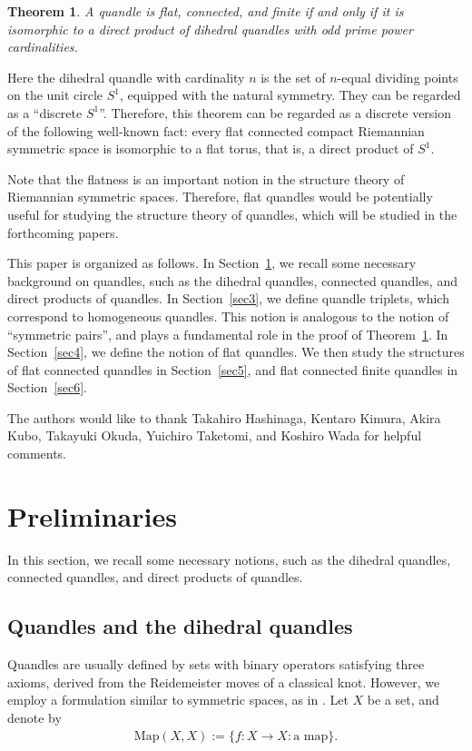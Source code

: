 \documentclass[12pt]{amsart}
\newtheorem{Thm}[Prop]{Theorem}
\theoremstyle{definition}
\begin{document}
\begin{Thm}\label{Thm1.1}
A quandle is flat, connected, and finite if and only if it is isomorphic to a direct product of dihedral quandles with odd prime power cardinalities.
\end{Thm}

Here the dihedral quandle with cardinality $ n $ is the set of $n$-equal dividing points on the unit circle $ S^{1} $, equipped with the natural symmetry. They can be regarded as a ``discrete $ S^{1} $''. Therefore, this theorem can be regarded as a discrete version of the following well-known fact: every flat connected compact Riemannian symmetric space is isomorphic to a flat torus, that is, a direct product of $ S^{1} $.

Note that the flatness is an important notion in the structure theory of Riemannian symmetric spaces. Therefore, flat quandles would be potentially useful for studying the structure theory of quandles, which will be studied in the forthcoming papers.

This paper is organized as follows. In Section~\ref{sec2}, we recall some necessary background on quandles, such as the dihedral quandles, connected quandles, and direct products of quandles. In Section~\ref{sec3}, we define quandle triplets, which correspond to homogeneous quandles. This notion is analogous to the notion of ``symmetric pairs'', and plays a fundamental role in the proof of Theorem~\ref{Thm1.1}. In Section~\ref{sec4}, we define the notion of flat quandles. We then study the structures of flat connected quandles in Section~\ref{sec5}, and flat connected finite quandles in Section~\ref{sec6}.

The authors would like to thank 
Takahiro Hashinaga, Kentaro Kimura, Akira Kubo, Takayuki Okuda, Yuichiro Taketomi, and Koshiro Wada 
for helpful comments.

\section{Preliminaries}\label{sec2}

In this section, we recall some necessary notions, such as the dihedral quandles, connected quandles, and direct products of quandles.

\subsection{Quandles and the dihedral quandles}

Quandles are usually defined by sets with binary operators satisfying three axioms, derived from the Reidemeister moves of a classical knot. However, we employ a formulation similar to symmetric spaces, as in \cite{Tamaru}. Let $ X $ be a set, and denote by
\begin{align*}
{\mathrm{Map}}(X,X) := \{ f : X \rightarrow X : \mbox{a map} \}.
\end{align*}
\end{document}
